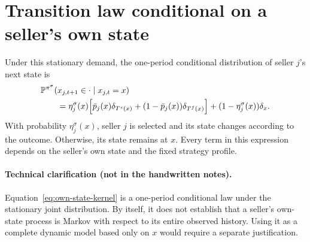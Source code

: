 \documentclass[11pt]{article}
\newcommand{\Pb}{\mathbb P}
\begin{document}
\section{Transition law conditional on a seller's own state}

Under this stationary demand, the one-period conditional distribution
of seller $j$'s next state is
\begin{equation}\label{eq:own-state-kernel}
\begin{aligned}
&\Pb^{\pi^\sigma}(x_{j,t+1}\in\cdot\mid x_{j,t}=x)\\
&\qquad=\eta_j^\sigma(x)\Bigl[
  \bar p_j(x)\delta_{T^s(x)}
 +(1-\bar p_j(x))\delta_{T^f(x)}\Bigr]
 +(1-\eta_j^\sigma(x))\delta_x.
\end{aligned}
\end{equation}
With probability $\eta_j^\sigma(x)$, seller $j$ is selected and its
state changes according to the outcome. Otherwise, its state remains
at $x$. Every term in this expression depends on the seller's own
state and the fixed strategy profile.

\paragraph{Technical clarification (not in the handwritten notes).}
Equation~\eqref{eq:own-state-kernel} is a one-period conditional law
under the stationary joint distribution. By itself, it does not
establish that a seller's own-state process is Markov with respect to
its entire observed history. Using it as a complete dynamic model
based only on $x$ would require a separate justification.
\end{document}

